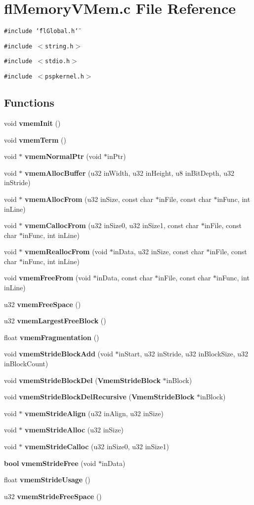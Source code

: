 \section{fl\-Memory\-VMem.c File Reference}
\label{flMemoryVMem_8c}
{\tt \#include \char`\"{}fl\-Global.h\char`\"{}}\par
{\tt \#include $<$string.h$>$}\par
{\tt \#include $<$stdio.h$>$}\par
{\tt \#include $<$pspkernel.h$>$}\par
\subsection*{Functions}
\begin{CompactItemize}
\item 
void {\bf vmem\-Init} ()
\item 
void {\bf vmem\-Term} ()
\item 
void $\ast$ {\bf vmem\-Normal\-Ptr} (void $\ast$in\-Ptr)
\item 
void $\ast$ {\bf vmem\-Alloc\-Buffer} (u32 in\-Width, u32 in\-Height, u8 in\-Bit\-Depth, u32 in\-Stride)
\item 
void $\ast$ {\bf vmem\-Alloc\-From} (u32 in\-Size, const char $\ast$in\-File, const char $\ast$in\-Func, int in\-Line)
\item 
void $\ast$ {\bf vmem\-Calloc\-From} (u32 in\-Size0, u32 in\-Size1, const char $\ast$in\-File, const char $\ast$in\-Func, int in\-Line)
\item 
void $\ast$ {\bf vmem\-Realloc\-From} (void $\ast$in\-Data, u32 in\-Size, const char $\ast$in\-File, const char $\ast$in\-Func, int in\-Line)
\item 
void {\bf vmem\-Free\-From} (void $\ast$in\-Data, const char $\ast$in\-File, const char $\ast$in\-Func, int in\-Line)
\item 
u32 {\bf vmem\-Free\-Space} ()
\item 
u32 {\bf vmem\-Largest\-Free\-Block} ()
\item 
float {\bf vmem\-Fragmentation} ()
\item 
void {\bf vmem\-Stride\-Block\-Add} (void $\ast$in\-Start, u32 in\-Stride, u32 in\-Block\-Size, u32 in\-Block\-Count)
\item 
void {\bf vmem\-Stride\-Block\-Del} ({\bf Vmem\-Stride\-Block} $\ast$in\-Block)
\item 
void {\bf vmem\-Stride\-Block\-Del\-Recursive} ({\bf Vmem\-Stride\-Block} $\ast$in\-Block)
\item 
void $\ast$ {\bf vmem\-Stride\-Align} (u32 in\-Align, u32 in\-Size)
\item 
void $\ast$ {\bf vmem\-Stride\-Alloc} (u32 in\-Size)
\item 
void $\ast$ {\bf vmem\-Stride\-Calloc} (u32 in\-Size0, u32 in\-Size1)
\item 
{\bf bool} {\bf vmem\-Stride\-Free} (void $\ast$in\-Data)
\item 
float {\bf vmem\-Stride\-Usage} ()
\item 
u32 {\bf vmem\-Stride\-Free\-Space} ()
\end{CompactItemize}
